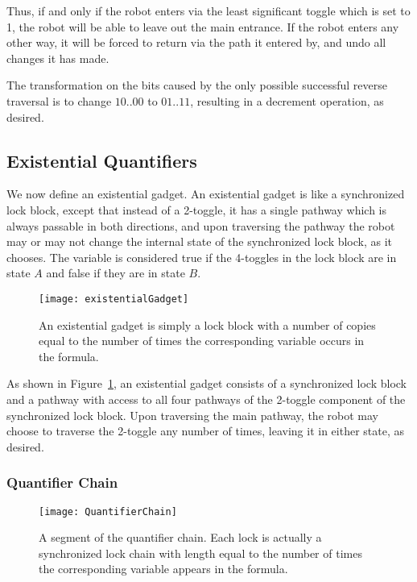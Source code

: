 Thus, if and only if the robot enters via the least significant toggle which is set to 1, the robot will be
able to leave out the main entrance. If the robot enters any other way, it will be forced to return via the
path it entered by, and undo all changes it has made.

The transformation on the bits caused by the only possible successful reverse traversal is to change $10 .. 00$
to $01 .. 11$, resulting in a decrement operation, as desired.

\subsection{Existential Quantifiers}
We now define an existential gadget. An existential gadget is like a synchronized lock block, except that instead of a
2-toggle, it has a single pathway which is always passable in both directions, and upon traversing the pathway
the robot may or may not change the internal state of the synchronized lock block, as it chooses. The variable is considered true if the 4-toggles in the lock block are in state $A$ and false if they are in state $B$.

\begin{figure}[h!]
\centering
    \texttt{[image: existentialGadget]}
    \caption{An existential gadget is simply a lock block with a number of copies equal to the number of times the corresponding variable occurs in the formula.}
    \label{fig:Existential}
\end{figure}

As shown in Figure~\ref{fig:Existential}, an existential gadget consists of a synchronized lock block and a pathway with access to all
four pathways of the 2-toggle component of the synchronized lock block. Upon traversing the main pathway, the robot may
choose to traverse the 2-toggle any number of times, leaving it in either state, as desired.

\subsubsection{Quantifier Chain}
\begin{figure}[h!]
\centering
    \texttt{[image: QuantifierChain]}
    \caption{A segment of the quantifier chain. Each lock is actually a synchronized lock chain with length equal to the number of times the corresponding variable appears in the formula.}
    \label{fig:QuantifierChain}
\end{figure}

